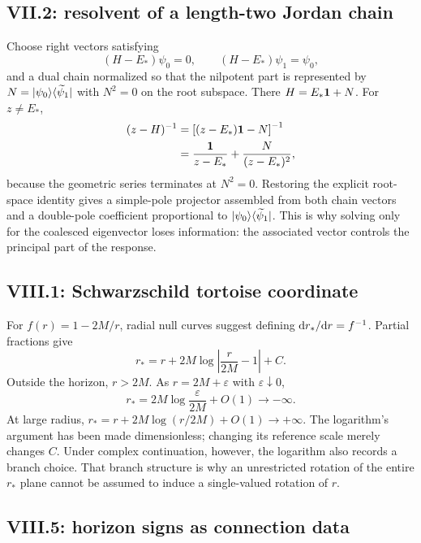 \subsection*{VII.2: resolvent of a length-two Jordan chain}

Choose right vectors satisfying
\begin{equation}
  (H-E_*)\psi_0=0,
  \qquad
  (H-E_*)\psi_1=\psi_0,
\end{equation}
and a dual chain normalized so that the nilpotent part is represented by
$N=\lvert \psi_0 \rangle\langle \widetilde\psi_1 \rvert$ with $N^2=0$ on the root
subspace.  There $H=E_*\mathbf{1}+N$.  For $z\ne E_*$,
\begin{align}
  (z-H)^{-1}
  &=\left[(z-E_*)\mathbf{1}-N\right]^{-1}
  \\
  &=\frac{\mathbf{1}}{z-E_*}
  +\frac{N}{(z-E_*)^2},
\end{align}
because the geometric series terminates at $N^2=0$.  Restoring the explicit
root-space identity gives a simple-pole projector assembled from both chain
vectors and a double-pole coefficient proportional to
$\lvert \psi_0 \rangle\langle \widetilde\psi_1 \rvert$.  This is why solving only for the
coalesced eigenvector loses information: the associated vector controls the
principal part of the response.

\subsection*{VIII.1: Schwarzschild tortoise coordinate}

For $f(r)=1-2M/r$, radial null curves suggest defining
$\mathrm{d} r_*/\mathrm{d} r=f^{-1}$.  Partial fractions give
\begin{equation}
  r_*=r+2M\log\left|\frac{r}{2M}-1\right|+C.
\end{equation}
Outside the horizon, $r>2M$.  As $r=2M+\varepsilon$ with
$\varepsilon\downarrow0$,
\begin{equation}
  r_*=2M\log\frac{\varepsilon}{2M}+O(1)\longrightarrow-\infty.
\end{equation}
At large radius,
$r_*=r+2M\log(r/2M)+O(1)\to+\infty$.  The logarithm's argument has been made
dimensionless; changing its reference scale merely changes $C$.  Under
complex continuation, however, the logarithm also records a branch choice.
That branch structure is why an unrestricted rotation of the entire
$r_*$ plane cannot be assumed to induce a single-valued rotation of $r$.

\subsection*{VIII.5: horizon signs as connection data}


